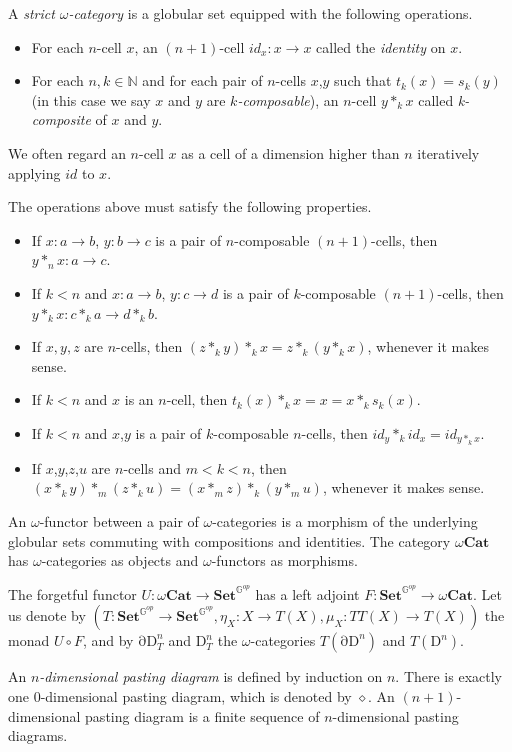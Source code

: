 \documentclass{amsart}
\theoremstyle{definition}
\theoremstyle{remark}
\newcommand{\cat}[1]{\mathbf{#1}}
\newcommand{\bbG}{\mathbb{G}}
\newcommand{\Set}{\cat{Set}}
\newcommand{\PSh}[1]{\Set^{#1^{op}}}
\newcommand{\nats}{\mathbb{N}}
\newcommand{\glob}{\PSh{\bbG}}
\newcommand{\ocat}{\omega \cat{Cat}}
\newcommand{\Dn}[1][n]{\mathrm{D}^{#1}}
\newcommand{\dDn}[1][n]{\mathrm{\partial D}^{#1}}
\numberwithin{table}{section}
\begin{document}
\begin{defn}
A \emph{strict $\omega$-category} is a globular set equipped with the following operations.
\begin{itemize}
\item For each $n$-cell $x$, an $(n+1)$-cell $id_x : x \to x$ called the \emph{identity} on $x$.
\item For each $n,k \in \nats$ and for each pair of $n$-cells $x$,$y$ such that
$t_k(x) = s_k(y)$ (in this case we say $x$ and $y$ are \emph{$k$-composable}),
an $n$-cell $y *_k x$ called \emph{k-composite} of $x$ and $y$.
\end{itemize}
We often regard an $n$-cell $x$ as a cell of a dimension higher than $n$ iteratively applying $id$ to $x$.

The operations above must satisfy the following properties.
\begin{itemize}
\item If $x : a \to b$, $y : b \to c$ is a pair of $n$-composable $(n+1)$-cells, then $y *_n x : a \to c$.
\item If $k < n$ and $x : a \to b$, $y : c \to d$ is a pair of $k$-composable $(n+1)$-cells, then $y *_k x : c *_k a \to d *_k b$.
\item If $x,y,z$ are $n$-cells, then $(z *_k y) *_k x = z *_k (y *_k x)$, whenever it makes sense.
\item If $k < n$ and $x$ is an $n$-cell, then $t_k(x) *_k x = x = x *_k s_k(x)$.
\item If $k < n$ and $x$,$y$ is a pair of $k$-composable $n$-cells, then $id_y *_k id_x = id_{y *_k x}$.
\item If $x$,$y$,$z$,$u$ are $n$-cells and $m < k < n$, then $(x *_k y) *_m (z *_k u) = (x *_m z) *_k (y *_m u)$, whenever it makes sense.
\end{itemize}

An $\omega$-functor between a pair of $\omega$-categories is a morphism of
the underlying globular sets commuting with compositions and identities.
The category $\ocat$ has $\omega$-categories as objects and $\omega$-functors as morphisms.
\end{defn}

The forgetful functor $U : \ocat \to \glob$ has a left adjoint $F : \glob \to \ocat$.
Let us denote by $(T : \glob \to \glob, \eta_X : X \to T(X), \mu_X : T T(X) \to T(X))$ the monad $U \circ F$,
and by $\dDn_T$ and $\Dn_T$ the $\omega$-categories $T(\dDn)$ and $T(\Dn)$.

An \emph{$n$-dimensional pasting diagram} is defined by induction on $n$.
There is exactly one $0$-dimensional pasting diagram, which is denoted by $\diamond$.
An $(n+1)$-dimensional pasting diagram is a finite sequence of $n$-dimensional pasting diagrams.
\end{document}
